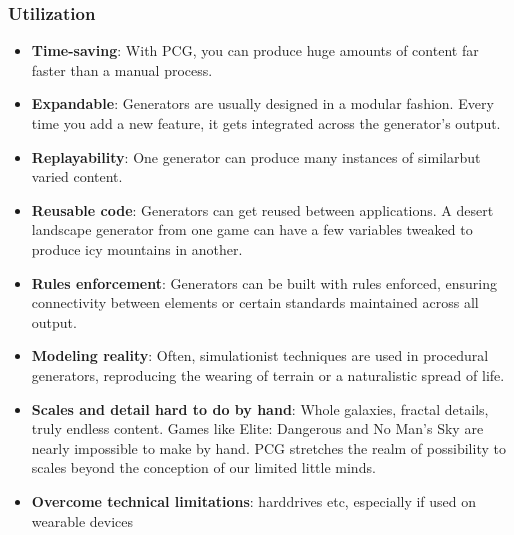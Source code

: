 \documentclass[MGS,Master,english]{twbook}%
\begin{document}
\subsubsection{Utilization}
\begin{itemize}
	\item \textbf{Time-saving}: With PCG, you can produce huge amounts of content far faster than a manual process. \cite{pcg::inGameDesign}
	\item \textbf{Expandable}: Generators are usually designed in a modular fashion. Every time you add a new feature, it gets integrated across the generator’s output. \cite{pcg::inGameDesign}
	\item \textbf{Replayability}: One generator can produce many instances of similarbut varied content. \cite{pcg::inGameDesign}
	\item \textbf{Reusable code}: Generators can get reused between applications. A desert landscape generator from one game can have a few variables tweaked to produce icy mountains in another. \cite{pcg::inGameDesign}
	\item \textbf{Rules enforcement}: Generators can be built with rules enforced, ensuring connectivity between elements or certain standards maintained across all output. \cite{pcg::inGameDesign}
	\item \textbf{Modeling reality}: Often, simulationist techniques are used in procedural generators, reproducing the wearing of terrain or a naturalistic spread of life. \cite{pcg::inGameDesign}
	\item \textbf{Scales and detail hard to do by hand}: Whole galaxies, fractal details, truly endless content. Games like Elite: Dangerous and No Man’s Sky are nearly impossible to make by hand. PCG stretches the realm of possibility to scales beyond the conception of our limited little minds. \cite{pcg::inGameDesign}
	\item \textbf{Overcome technical limitations}: harddrives etc, especially if used on wearable devices \cite{pcg::inGameDesign}
\end{itemize}
\end{document}
